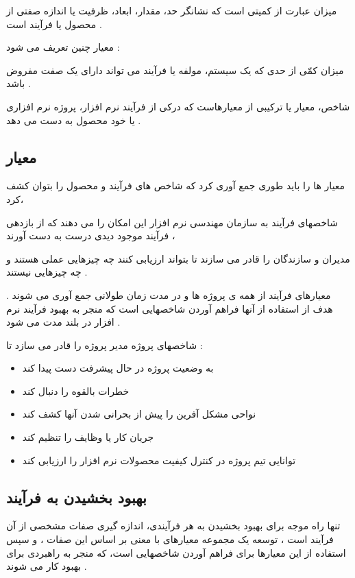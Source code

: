 \documentclass{article}
\begin{document}
میزان عبارت از کمیتی است که نشانگر حد، مقدار، ابعاد، ظرفیت یا اندازه صفتی از محصول یا فرآیند است .

معیار چنین تعریف می شود :

میزان کمّی از حدی که یک سیستم، مولفه یا فرآیند می تواند دارای یک صفت مفروض باشد .

شاخص، معیار یا ترکیبی از معیارهاست که درکی از فرآیند نرم افزار، پروژه نرم افزاری یا خود محصول به دست می دهد .



\subsection{معیار}


معیار ها را باید طوری جمع آوری کرد که شاخص های فرآیند و محصول را بتوان کشف کرد، 

شاخصهای فرآیند به سازمان مهندسی نرم افزار این امکان را می دهند که از بازدهی فرآیند موجود دیدی درست به دست آورند ،

مدیران و سازندگان را قادر می سازند تا بتواند ارزیابی کنند چه چیزهایی عملی هستند و چه چیزهایی نیستند .

معیارهای فرآیند از همه ی پروژه ها و در مدت زمان طولانی جمع آوری می شوند . هدف از استفاده از آنها فراهم آوردن شاخصهایی است که منجر به بهبود فرآیند نرم افزار در بلند مدت می شود .

شاخصهای پروژه مدیر پروژه را قادر می سازد تا :

\begin{itemize}
	\item به وضعیت پروژه در حال پیشرفت دست پیدا کند
	\item خطرات بالقوه را دنبال کند
	\item نواحی مشکل آفرین را پیش از بحرانی شدن آنها کشف کند
	\item جریان کار یا وظایف را تنظیم کند
	\item توانایی تیم پروژه در کنترل کیفیت محصولات نرم افزار را ارزیابی کند
\end{itemize}



\subsection{بهبود بخشیدن به فرآیند}

تنها راه موجه برای بهبود بخشیدن به هر فرآیندی، اندازه گیری صفات مشخصی از آن فرآیند است ، توسعه یک مجموعه معیارهای با معنی بر اساس این صفات ، و سپس استفاده از این معیارها برای فراهم آوردن شاخصهایی است، که منجر به راهبردی برای بهبود کار می شوند .
\end{document}
